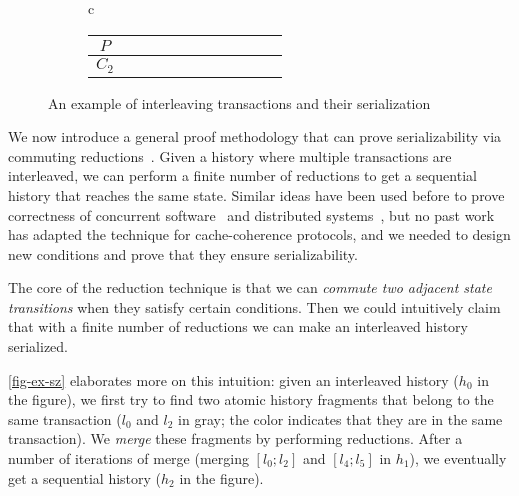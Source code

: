\documentclass[sigplan,10pt,review,anonymous,screen]{acmart}\settopmatter{printfolios=true,printccs=false,printacmref=false}
\begin{document}
\begin{figure*}[t]
\begin{subfigure}[b]{0.58\textwidth}
\begin{tabular}{c}
\begin{tabular}{c|cccccccccc}
        \hline
        $P$ & & \rdcircf{$3$} & & \rdcircf{$5$} & & & \blcircf{$6$} & & \blcircf{$9$} & \\
        \hline
        $C_2$ & & & \rdcircf{$4$} & & & \blcircf{$2$} & & & & \blcircf{$10$} \\
        \hline
      \end{tabular}
    \end{tabular}
    \renewcommand{\arraystretch}{1.0}
  \end{subfigure}
  \caption{An example of interleaving transactions and their serialization }
  \label{fig-ex-sz}
\end{figure*}


We now introduce a general proof methodology that can prove serializability via commuting reductions~\cite{reduction}.
Given a history where multiple transactions are interleaved, we can perform a finite number of reductions to get a sequential history that reaches the same state.
Similar ideas have been used before to prove correctness of concurrent software~\cite{Chajed:2018} and distributed systems~\cite{Hawblitzel:2015,Hawblitzel:2017}, but no past work has adapted the technique for cache-coherence protocols, and we needed to design new conditions and prove that they ensure serializability.

The core of the reduction technique is that we can \emph{commute two adjacent state transitions} when they satisfy certain conditions.
Then we could intuitively claim that with a finite number of reductions we can make an interleaved history serialized.

\autoref{fig-ex-sz} elaborates more on this intuition: given an interleaved history ($h_0$ in the figure), we first try to find two atomic history fragments that belong to the same transaction ($l_0$ and $l_2$ in gray; the color indicates that they are in the same transaction).
We \emph{merge} these fragments by performing reductions.
After a number of iterations of merge (merging $[l_0; l_2]$ and $[l_4; l_5]$ in $h_1$), we eventually get a sequential history ($h_2$ in the figure).
\end{document}
